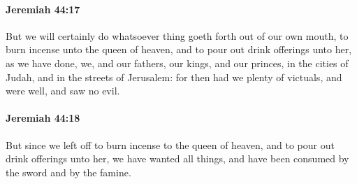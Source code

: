 		\paragraph{Jeremiah 44:17} %
			\label{JEREMIAH-44-17}

			But we will certainly do whatsoever thing goeth forth out of our own mouth, to burn incense unto the queen of heaven, and to pour out drink offerings unto her, as we have done, we, and our fathers, our kings, and our princes, in the cities of Judah, and in the streets of Jerusalem: for then had we plenty of victuals, and were well, and saw no evil.


		\paragraph{Jeremiah 44:18} %
			\label{JEREMIAH-44-18}

			But since we left off to burn incense to the queen of heaven, and to pour out drink offerings unto her, we have wanted all things, and have been consumed by the sword and by the famine.


